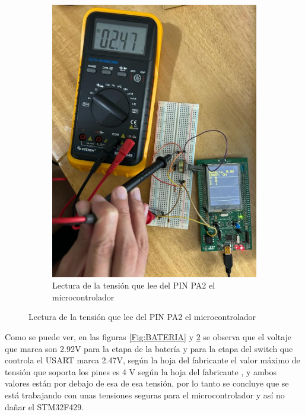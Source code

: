 \begin{figure}[H]
\begin{subfigure}{0.5\textwidth}
    \includegraphics[width=\textwidth]{Imagenes/USART.jpg} 
    \caption{Lectura de la tensión que lee del PIN PA2 el microcontrolador}
    \label{Fig:USART}
\end{subfigure}
\end{figure}

Como se puede ver, en las figuras \ref{Fig:BATERIA} y \ref{Fig:USART} se observa que el voltaje que marca son 2.92V para la etapa de la batería y para la etapa del switch que controla el USART marca 2.47V, según la hoja del fabricante el valor máximo de tensión que soporta los pines es 4 V según la hoja del fabricante \cite{stm32micro, datasheet}, y ambos valores están por debajo de esa de esa tensión, por lo tanto se concluye que se está trabajando con unas tensiones seguras para el microcontrolador y así no dañar el STM32F429.




































